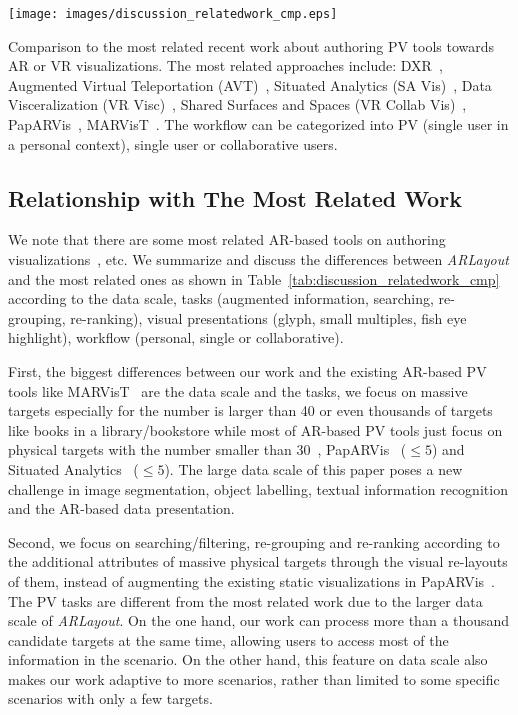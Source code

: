 \begin{table}[htp]
    \centering
    \texttt{[image: images/discussion\_relatedwork\_cmp.eps]}
    \caption{
        Comparison to the most related recent work about authoring PV tools towards AR or VR visualizations.
        The most related approaches include:
        DXR~\cite{Sicat2019}, Augmented Virtual Teleportation (AVT)~\cite{Rhee2020}, 
        Situated Analytics (SA Vis)~\cite{ElSayed2015}, Data Visceralization (VR Visc)~\cite{Lee2021a},
        Shared Surfaces and Spaces (VR Collab Vis)~\cite{Lee2021}, PapARVis~\cite{Chen2020a},
        MARVisT~\cite{Chen2020}.
        The workflow can be categorized into PV (single user in a personal context),
        single user or collaborative users.
    }
    \label{tab:discussion_relatedwork_cmp}
\end{table}



\subsection{Relationship with The Most Related Work}
\label{sec:relatedworkcomparison}

We note that there are some most related AR-based tools on authoring visualizations~\cite{Chen2020,Chen2020a}, etc.
We summarize and discuss the differences between \textit{ARLayout} and the most related ones
as shown in Table~\ref{tab:discussion_relatedwork_cmp}
according to the data scale, tasks (augmented information, searching, re-grouping, re-ranking),
visual presentations (glyph, small multiples, fish eye highlight), workflow (personal, single or collaborative).

First, the biggest differences between our work and the existing AR-based PV tools like MARVisT~\cite{Chen2020}
are the data scale and the tasks, we focus on massive targets especially for
the number is larger than 40 or even thousands of targets like books in a library/bookstore
while most of AR-based PV tools just focus on physical targets with the number
smaller than $30$~\cite{Chen2020}, PapARVis~\cite{Chen2020a} ($\leq 5$) and Situated Analytics~\cite{ElSayed2015} ($\leq 5$).
The large data scale of this paper poses a new challenge in image segmentation, object labelling, textual information
recognition and the AR-based data presentation.

Second, we focus on searching/filtering, re-grouping and re-ranking according to
the additional attributes of massive physical targets
through the visual re-layouts of them,
instead of augmenting the existing static visualizations in PapARVis~\cite{Chen2020a}.
The PV tasks are different from the most related work due to the larger data scale of \textit{ARLayout}.
On the one hand, our work can process more than a thousand candidate targets at the same time,
allowing users to access most of the information in the scenario.
On the other hand, this feature on data scale also makes our work adaptive to more scenarios,
rather than limited to some specific scenarios with only a few targets.


